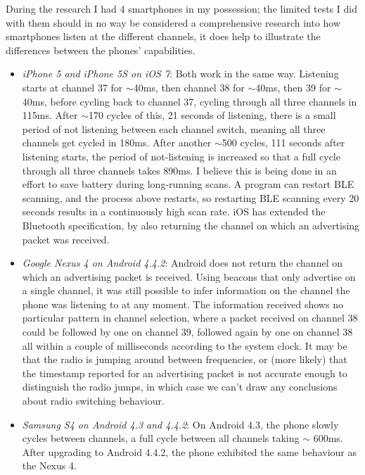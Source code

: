 During the research I had 4 smartphones in my possession; the limited tests I did with them should in no way be considered a comprehensive research into how smartphones listen at the different channels, it does help to illustrate the differences between the phones' capabilities.
\begin{itemize}
    \item \emph{iPhone 5 and iPhone 5S on iOS 7}: Both work in the same way.
        Listening starts at channel 37 for $\sim$40ms, then channel 38 for $\sim$40ms, then 39 for $\sim$40ms, before cycling back to channel 37, cycling through all three channels in 115ms.
        After $\sim$170 cycles of this, 21 seconds of listening, there is a small period of not listening between each channel switch, meaning all three channels get cycled in 180ms.
        After another $\sim$500 cycles, 111 seconds after listening starts, the period of not-listening is increased so that a full cycle through all three channels takes 890ms.
        I believe this is being done in an effort to save battery during long-running scans.
        A program can restart BLE scanning, and the process above restarts, so restarting BLE scanning every 20 seconds results in a continuously high scan rate.
        iOS has extended the Bluetooth specification, by also returning the channel on which an advertising packet was received.
    \item \emph{Google Nexus 4 on Android 4.4.2}: Android does not return the channel on which an advertising packet is received. 
        Using beacons that only advertise on a single channel, it was still possible to infer information on the channel the phone was listening to at any moment.
        The information received shows no particular pattern in channel selection, where a packet received on channel 38 could be followed by one on channel 39, followed again by one on channel 38 all within a couple of milliseconds according to the system clock.
        It may be that the radio is jumping around between frequencies, or (more likely) that the timestamp reported for an advertising packet is not accurate enough to distinguish the radio jumps, in which case we can't draw any conclusions about radio switching behaviour.
    \item \emph{Samsung S4 on Android 4.3 and 4.4.2}: On Android 4.3, the phone slowly cycles between channels, a full cycle between all channels taking $\sim$ 600ms.
        After upgrading to Android 4.4.2, the phone exhibited the same behaviour as the Nexus 4.
\end{itemize}
        

